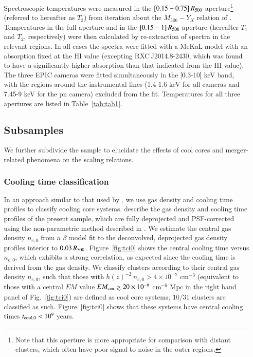 \documentclass[oldversion]{aa}
\begin{document}
{Spectroscopic temperatures were measured in the $[0.15-0.75]\,R_{500}$ aperture\footnote{Note that this aperture is more appropriate for comparison with distant clusters, which often have poor signal to noise in the outer regions.} (referred to hereafter as $T_3$) from iteration about the $M_{500}-Y_X$ relation of \citet[][]{app07}. Temperatures in the full aperture and in the  $[0.15-1]\,R_{500}$ aperture (hereafter $T_1$ and $T_2$, respectively) were then calculated by re-extraction of spectra in the relevant regions. In all cases the spectra were fitted with a {\sc MeKaL} model with an absorption fixed at the HI value (excepting RXC\,J2014.8-2430, which was found to have a significantly higher absorption than that indicated from the HI value). The three EPIC cameras were fitted simultaneously in the [0.3-10] keV band, with the regions around the instrumental lines (1.4-1.6 keV for all cameras and 7.45-9 keV for the pn camera) excluded from the fit. Temperatures for all three apertures are listed in Table~\ref{tab:tab1}.


\subsection{Subsamples}
\label{sec:subsamples}

We further subdivide the sample to elucidate the effects of cool cores
and merger-related phenomena on the scaling relations.

\subsubsection{Cooling time classification}

In an approach similar to that used by \citet{ohara06}, we use gas density and cooling time profiles to classify cooling core systems. \citet{croston08} describe the gas density and cooling time profiles of the present sample, which are fully deprojected and PSF-corrected using the non-parametric method described in \citet{croston06}. We estimate the central gas density $n_{e,0}$ from a $\beta$ model fit to the deconvolved, deprojected gas density profiles interior to $0.03\,R_{500}$. Figure~\ref{fig:tci0} shows the central cooling time versus $n_{e,0}$, which exhibits a strong correlation, as expected since the cooling time is derived from the gas density. We classify clusters according to their central gas density $n_{e,0}$, such that those with
$h(z)^{-2}\ n_{e,0} > 4 \times 10^{-2}$ cm$^{-3}$ (equivalent to those with a central $EM$ value $EM_{\rm cen} \gtrsim 20 \times 10^{-6}$ cm$^{-6}$ Mpc in the right hand panel of Fig.~\ref{fig:tci0}) are defined 
as cool core systems; 10/31 clusters are classified as such. Figure~\ref{fig:tci0} shows that these systems
have central cooling times $t_{\rm cool,0} < 10^{9}$ years. 

}
\end{document}

